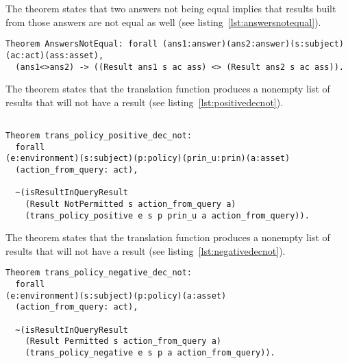 The theorem  states that two answers not being equal implies that results built from those answers are not equal as well (see listing~\ref{lst:answersnotequal}).

\begin{lstlisting}
Theorem AnswersNotEqual: forall (ans1:answer)(ans2:answer)(s:subject)(ac:act)(ass:asset),
  (ans1<>ans2) -> ((Result ans1 s ac ass) <> (Result ans2 s ac ass)).

\end{lstlisting}

The theorem  states that the translation function  produces a nonempty list of results that will not have a  result (see listing~\ref{lst:positivedecnot}).


\begin{minipage}[c]{0.95\textwidth}
\begin{lstlisting}

Theorem trans_policy_positive_dec_not:
  forall 
(e:environment)(s:subject)(p:policy)(prin_u:prin)(a:asset)
  (action_from_query: act),
 
  ~(isResultInQueryResult 
    (Result NotPermitted s action_from_query a)
    (trans_policy_positive e s p prin_u a action_from_query)).
\end{lstlisting}
\end{minipage}

The theorem  states that the translation function  produces a nonempty list of results that will not have a  result (see listing~\ref{lst:negativedecnot}).

\begin{minipage}[c]{0.95\textwidth}
\begin{lstlisting}
Theorem trans_policy_negative_dec_not:
  forall 
(e:environment)(s:subject)(p:policy)(a:asset)
  (action_from_query: act),
 
  ~(isResultInQueryResult 
    (Result Permitted s action_from_query a)
    (trans_policy_negative e s p a action_from_query)).

\end{lstlisting}
\end{minipage}

